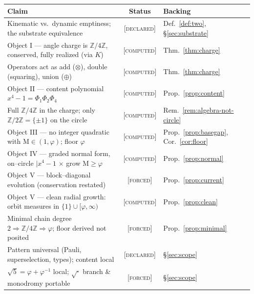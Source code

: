 \documentclass[11pt]{article}
\theoremstyle{plain}
\theoremstyle{definition}
\theoremstyle{remark}
\newcommand{\forced}{\textcolor{forcedc}{\textsc{[forced]}}}
\newcommand{\computed}{\textcolor{forcedc}{\textsc{[computed]}}}
\newcommand{\declared}{\textcolor{declaredc}{\textsc{[declared]}}}
\newcommand{\Z}{\mathbb{Z}}
\newcommand{\Mah}{\mathrm{M}}
\begin{document}
\begin{center}
\renewcommand{\arraystretch}{1.18}
\begin{tabular}{@{}p{8.2cm}cl@{}}
\toprule
\textbf{Claim} & \textbf{Status} & \textbf{Backing}\\
\midrule
Kinematic vs.\ dynamic emptiness; the substrate equivalence & \declared & Def.~\ref{def:two}, \S\ref{sec:substrate}\\
Object I --- angle charge is $\Z/4\Z$, conserved, fully realized (via $K$) & \computed & Thm.~\ref{thm:charge}\\
Operators act as add ($\otimes$), double (squaring), union ($\oplus$) & \computed & Thm.~\ref{thm:charge}\\
Object II --- content polynomial $x^4-1=\Phi_1\Phi_2\Phi_4$ & \computed & Prop.~\ref{prop:content}\\
Full $\Z/4\Z$ in the charge; only $\Z/2\Z{=}\{\pm1\}$ on the circle & \computed & Rem.~\ref{rem:algebra-not-circle}\\
Object III --- no integer quadratic with $\Mah\in(1,\varphi)$; floor $\varphi$ & \computed & Prop.~\ref{prop:basegap}, Cor.~\ref{cor:floor}\\
Object IV --- graded normal form, on--circle $\mid x^4-1$ $\times$ grow $\Mah{\ge}\varphi$ & \computed & Prop.~\ref{prop:normal}\\
Object V --- block--diagonal evolution (conservation restated) & \forced & Prop.~\ref{prop:current}\\
Object V --- clean radial growth: orbit measures in $\{1\}\cup[\varphi,\infty)$ & \computed & Prop.~\ref{prop:clean}\\
Minimal chain degree $2\Rightarrow\Z/4\Z\Rightarrow\varphi$; floor derived not posited & \forced & Prop.~\ref{prop:minimal}\\
Pattern universal (Pauli, superselection, types); content local & \declared & \S\ref{sec:scope}\\
$\sqrt5=\varphi+\varphi^{-1}$ local; $\sqrt{\cdot}$ branch \& monodromy portable & \forced & \S\ref{sec:scope}\\
\bottomrule
\end{tabular}
\end{center}
\end{document}
